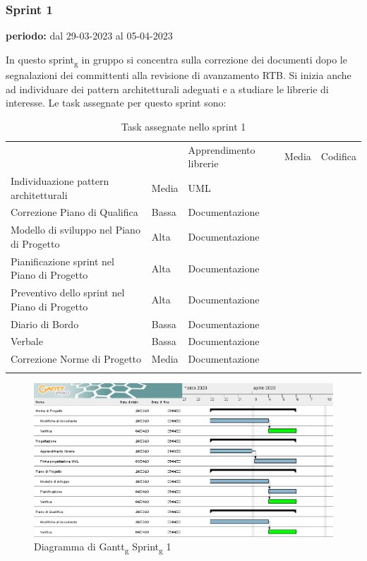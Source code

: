 \subsubsection{Sprint 1}
\begin{center}
\textbf{periodo:} dal 29-03-2023 al 05-04-2023\\
\end{center}
In questo sprint\textsubscript{g} in gruppo si concentra sulla correzione dei documenti dopo le segnalazioni dei committenti alla revisione di avanzamento RTB.
Si inizia anche ad individuare dei pattern architetturali adeguati e a studiare le librerie di interesse. Le task assegnate per questo sprint sono:
\begin{longtable}{ 
	>{\centering}M{0.30\textwidth} 
	>{\centering}M{0.10\textwidth}
	>{\centering}M{0.20\textwidth}
	}
	\rowcolorhead
	\centering 
	 &	
	 &
	\endfirsthead	
	\endhead
	
	Apprendimento librerie & Media & Codifica\tabularnewline
	Individuazione pattern architetturali & Media & UML\tabularnewline
	Correzione Piano di Qualifica & Bassa & Documentazione\tabularnewline
	Modello di sviluppo nel Piano di Progetto & Alta & Documentazione\tabularnewline
	Pianificazione sprint nel Piano di Progetto & Alta & Documentazione\tabularnewline
	Preventivo dello sprint nel Piano di Progetto & Alta & Documentazione\tabularnewline
	Diario di Bordo & Bassa & Documentazione\tabularnewline
	Verbale & Bassa & Documentazione\tabularnewline
	Correzione Norme di Progetto & Media & Documentazione\tabularnewline
	\captionline \caption{Task assegnate nello sprint 1}
\end{longtable}


\begin{figure}[H]
    \centering
    \includegraphics[scale=0.56]{image/gantt_sprint1.PNG}
    \caption{Diagramma di Gantt\textsubscript{g} Sprint\textsubscript{g} 1}
\end{figure}
